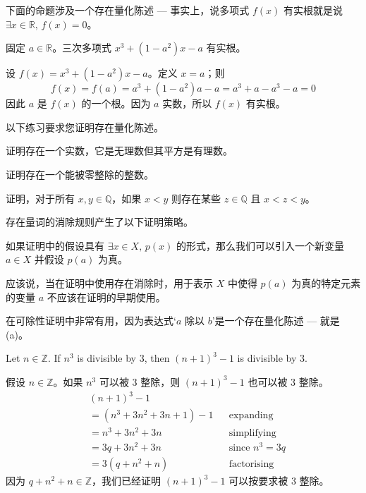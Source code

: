 下面的命题涉及一个存在量化陈述 --- 事实上，说多项式 $f(x)$ 有实根就是说 $\exists x \in \mathbb{R},\, f(x) = 0 $。

\begin{proposition}
固定 $a \in \mathbb{R}$。三次多项式 $x^3 + (1-a^2)x - a$ 有实根。
\end{proposition}
\begin{cproof}
设 $f(x)=x^3+(1-a^2)x-a$。定义 $x=a$；则
\[f(x) = f(a) = a^3 + (1-a^2)a - a = a^3 + a - a^3 - a = 0\]
因此 $a$ 是 $f(x)$ 的一个根。因为 $a$ 实数，所以 $f(x)$ 有实根。
\end{cproof}

以下练习要求您证明存在量化陈述。

\begin{exercise}
证明存在一个实数，它是无理数但其平方是有理数。
\end{exercise}

\begin{exercise}
证明存在一个能被零整除的整数。
\end{exercise}

\begin{example}
证明，对于所有 $x,y \in \mathbb{Q}$，如果 $x < y$ 则存在某些 $z \in \mathbb{Q}$ 且 $x<z<y$。
\end{example}

存在量词的消除规则产生了以下证明策略。

\begin{strategy}[存在量化陈述假设]
\label{strAssumingExistential}
如果证明中的假设具有 $\exists x \in X,\, p(x)$ 的形式，那么我们可以引入一个新变量 $a \in X$ 并假设 $p(a)$ 为真。
\end{strategy}

应该说，当在证明中使用存在消除时，用于表示 $X$ 中使得 $p(a)$ 为真的特定元素的变量 $a$ 不应该在证明的早期使用。

 在可除性证明中非常有用，因为表达式`$a$ 除以 $b$'是一个存在量化陈述 --- 就是 (a)。

\begin{proposition}
Let $n \in \mathbb{Z}$. If $n^3$ is divisible by $3$, then $(n+1)^3 - 1$ is divisible by $3$.
\end{proposition}

\begin{cproof}
假设 $n \in \mathbb{Z}$。如果 $n^3$ 可以被 $3$ 整除，则 $(n+1)^3 - 1$ 也可以被 $3$ 整除。
\begin{align*}
& (n+1)^3 - 1 && \\
&= (n^3 + 3n^2 + 3n + 1) - 1 && \text{expanding} \\
&= n^3 + 3n^2 + 3n && \text{simplifying} \\
&= 3q + 3n^2 + 3n && \text{since $n^3 = 3q$} \\
&= 3(q+n^2+n) && \text{factorising}
\end{align*}
因为 $q+n^2+n \in \mathbb{Z}$，我们已经证明 $(n+1)^3 - 1$ 可以按要求被 $3$ 整除。
\end{cproof}

